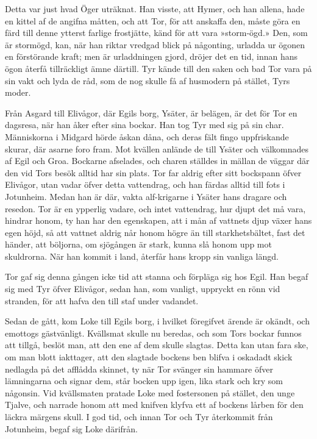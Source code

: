 Detta var just hvad Öger uträknat. Han visste, att Hymer, och han
allena, hade en kittel af de angifna måtten, och att Tor, för att
anskaffa den, måste göra en färd till denne ytterst farlige frostjätte,
känd för att vara »storm-ögd.» Den, som är stormögd, kan, när han riktar
vredgad blick på någonting, urladda ur ögonen en förstörande kraft; men
är urladdningen gjord, dröjer det en tid, innan hans ögon återfå
tillräckligt ämne därtill. Tyr kände till den saken och bad Tor vara på
sin vakt och lyda de råd, som de nog skulle få af husmodern på stället,
Tyrs moder.

Från Asgard till Elivågor, där Egils borg, Ysäter, är belägen, är det
för Tor en dagsresa, när han åker efter sina bockar. Han tog Tyr med sig
på sin char. Människorna i Midgard hörde åskan dåna, och deras fält
fingo uppfriskande skurar, där asarne foro fram. Mot kvällen anlände de
till Ysäter och välkomnades af Egil och Groa. Bockarne afselades, och
charen ställdes in mällan de väggar där den vid Tors besök alltid har
sin plats. Tor far aldrig efter sitt bockspann öfver Elivågor, utan
vadar öfver detta vattendrag, och han färdas alltid till fots i
Jotunheim. Medan han är där, vakta alf-krigarne i Ysäter hans dragare
och resedon. Tor är en ypperlig vadare, och intet vattendrag, hur djupt
det må vara, hindrar honom, ty han har den egenskapen, att i mån af
vattnets djup växer hans egen höjd, så att vattnet aldrig når honom
högre än till starkhetsbältet, fast det händer, att böljorna, om
sjögången är stark, kunna slå honom upp mot skuldrorna. När han kommit i
land, återfår hans kropp sin vanliga längd.

\protect\hypertarget{lb1625905.xhtmlux5cux23start48}{}{}\protect\hypertarget{lb1625905.xhtmlux5cux23start48-a}{}{}\protect\hypertarget{lb1625905.xhtmlux5cux23start48-b}{}{}\protect\hypertarget{lb1625905.xhtmlux5cux23start48-c}{}{}\protect\hypertarget{lb1625905.xhtmlux5cux23start48-d}{}{}

Tor gaf sig denna gången icke tid att stanna och förpläga sig hos Egil.
Han begaf sig med Tyr öfver Elivågor, sedan han, som vanligt, uppryckt
en rönn vid stranden, för att hafva den till staf under vadandet.

Sedan de gått, kom Loke till Egils borg, i hvilket föregifvet ärende är
okändt, och emottogs gästvänligt. Kvällsmat skulle nu beredas, och som
Tors bockar funnos att tillgå, beslöt man, att den ene af dem skulle
slagtas. Detta kan utan fara ske, om man blott iakttager, att den
slagtade bockens ben blifva i oskadadt skick nedlagda på det afflådda
skinnet, ty när Tor svänger sin hammare öfver lämningarna och signar
dem, står bocken upp igen, lika stark och kry som någonsin. Vid
kvällsmaten pratade Loke med fostersonen på stället, den unge Tjalve,
och narrade honom att med knifven klyfva ett af bockens lårben för den
läckra märgens skull. I god tid, och innan Tor och Tyr återkommit från
Jotunheim, begaf sig Loke därifrån.

